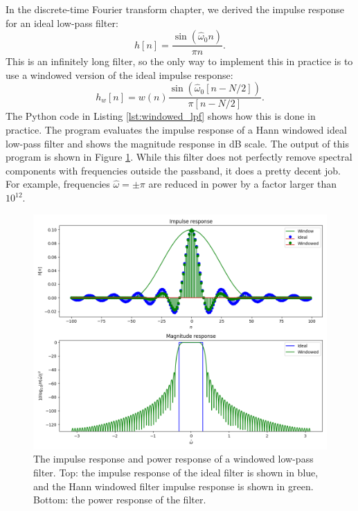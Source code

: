 In the discrete-time Fourier transform chapter, we derived the impulse response for an ideal low-pass filter:
\begin{equation}
  h[n] = \frac{\sin(\hat{\omega}_0 n)}{\pi n}.
\end{equation}
This is an infinitely long filter, so the only way to implement this
in practice is to use a windowed version of the ideal impulse
response:
\begin{equation}
  h_w[n] = w(n)\frac{\sin(\hat{\omega}_0 [n-N/2])}{\pi [n-N/2]}.
\end{equation}
The Python code in Listing \ref{lst:windowed_lpf} shows how this is
done in practice. The program evaluates the impulse response of a
Hann windowed ideal low-pass filter and shows the magnitude response
in dB scale. The output of this program is shown in Figure
\ref{fig:lpf_hann}. While this filter does not perfectly remove
spectral components with frequencies outside the passband, it does a
pretty decent job. For example, frequencies $\hat{\omega}=\pm \pi$ are
reduced in power by a factor larger than $10^{12}$.

\begin{figure}
  \begin{center}
    \includegraphics[width=\textwidth]{code/022_window_functions/windowed_lpf.png}
  \end{center}
  \caption{The impulse response and power response of a windowed
    low-pass filter. Top: the impulse response of the ideal filter is
    shown in blue, and the Hann windowed filter impulse response is
    shown in green. Bottom: the power response of the filter.}
  \label{fig:lpf_hann}
\end{figure}





